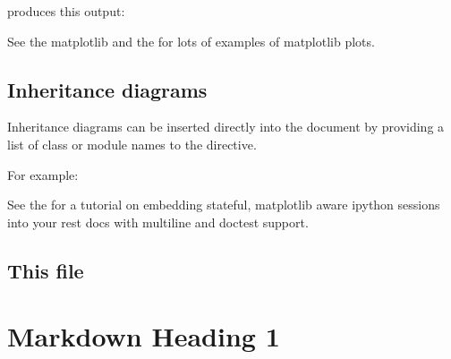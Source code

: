 \documentclass[letterpaper,10pt,english]{sphinxmanual}
\begin{document}
\sphinxAtStartPar
produces this output:

\begin{figure}[htbp]
\centering

\noindent{}
\end{figure}

\sphinxAtStartPar
See the matplotlib  and
the  for
lots of examples of matplotlib plots.


\section{Inheritance diagrams}
\label{\detokenize{chapter2:inheritance-diagrams}}
\sphinxAtStartPar
Inheritance diagrams can be inserted directly into the document by
providing a list of class or module names to the
 directive.

\sphinxAtStartPar
For example:

\begin{sphinxVerbatim}[commandchars=\\\{\}]
  
\end{sphinxVerbatim}

\sphinxAtStartPar
See the  for a tutorial on embedding stateful,
matplotlib aware ipython sessions into your rest docs with multiline
and doctest support.


\section{This file}
\label{\detokenize{chapter2:this-file}}\label{\detokenize{chapter2:extensions-literal}}
\begin{sphinxVerbatim}[commandchars=\\\{\}]

\end{sphinxVerbatim}

\sphinxstepscope


\chapter{Markdown Heading 1}
\label{\detokenize{chapter3:markdown-heading-1}}\label{\detokenize{chapter3::doc}}\begin{quote}

\sphinxAtStartPar
{}
\end{quote}
\end{document}

